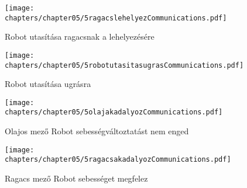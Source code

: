 \begin{figure}[h]
	\begin{center}
		\texttt{[image: chapters/chapter05/5ragacslehelyezCommunications.pdf]}
		\caption{Robot utasítása ragacsnak a lehelyezésére}
		\label{fig:5robotragacslehelyezCommunication}
	\end{center}
\end{figure}

\begin{figure}[h]
	\begin{center}
		\texttt{[image: chapters/chapter05/5robotutasitasugrasCommunications.pdf]}
		\caption{Robot utasítása ugrásra}
		\label{fig:5robotutasitugrasCommunication}
	\end{center}
\end{figure}

\begin{figure}[h]
	\begin{center}
		\texttt{[image: chapters/chapter05/5olajakadalyozCommunications.pdf]}
		\caption{Olajos mező Robot sebességváltoztatást nem enged}
		\label{fig:5olajakadalyozCommunication}
	\end{center}
\end{figure}

\begin{figure}[h]
	\begin{center}
		\texttt{[image: chapters/chapter05/5ragacsakadalyozCommunications.pdf]}
		\caption{Ragacs mező Robot sebességet megfelez}
		\label{fig:5ragacsakadalyozCommunication}
	\end{center}
\end{figure}

\clearpage

